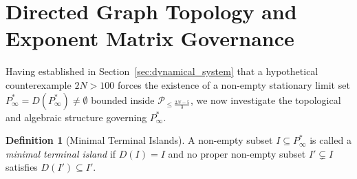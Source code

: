 \documentclass[11pt,a4paper]{article}
\theoremstyle{definition}
\newtheorem{definition}[theorem]{Definition}
\begin{document}
\section{Directed Graph Topology and Exponent Matrix Governance}
\label{sec:graph_topology}

Having established in Section~\ref{sec:dynamical_system} that a hypothetical counterexample $2N > 100$ forces the existence of a non-empty stationary limit set $P^*_\infty = D(P^*_\infty) \neq \emptyset$ bounded inside $\mathcal{P}_{\le \frac{2N-5}{3}}$, we now investigate the topological and algebraic structure governing $P^*_\infty$.

\begin{definition}[Minimal Terminal Islands]
\label{def:terminal_island}
A non-empty subset $I \subseteq P^*_\infty$ is called a \textit{minimal terminal island} if $D(I) = I$ and no proper non-empty subset $I' \subsetneq I$ satisfies $D(I') \subseteq I'$.
\end{definition}
\end{document}
